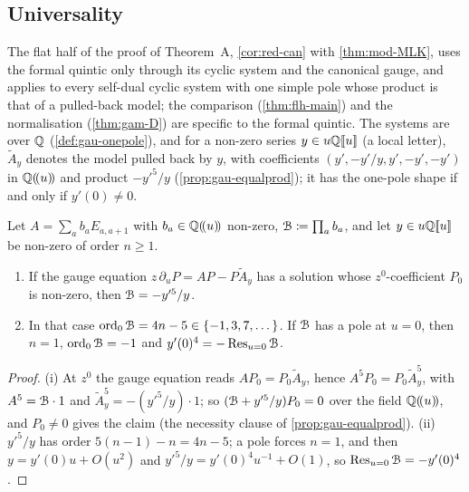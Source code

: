 \subsection{Universality}
\label{sec:mai-univ}

The flat half of the proof of Theorem~A, \cref{cor:red-can} with \cref{thm:mod-MLK}, uses the formal quintic only through its cyclic system and the canonical gauge, and applies to every self-dual cyclic system with one simple pole whose product is that of a pulled-back model; the comparison (\cref{thm:flh-main}) and the normalisation (\cref{thm:gam-D}) are specific to the formal quintic. The systems are over $\mathbb{Q}$ (\cref{def:gau-onepole}), and for a non-zero series $y\in u\mathbb{Q}[\![ u ]\!]$ (a local letter), $\tilde A_y$ denotes the model pulled back by $y$, with coefficients $(y',-y'/y,y',-y',-y')$ in $\mathbb{Q}(\!(u)\!)$ and product $-y'^5/y$ (\cref{prop:gau-equalprod}); it has the one-pole shape if and only if $y'(0)\neq0$.

\begin{lem}
\label{lem:mai-pole}
Let $A=\sum_ab_aE_{a,a+1}$ with $b_a\in\mathbb{Q}(\!(u)\!)$ non-zero, $\mathcal{B}\coloneqq\prod_ab_a$, and let $y\in u\mathbb{Q}[\![ u ]\!]$ be non-zero of order $n\geq1$.
\begin{enumerate}
\item If the gauge equation $z\,\partial_uP=AP-P\tilde A_y$ has a solution whose $z^0$-coefficient $P_0$ is non-zero, then $\mathcal{B}=-y'^5/y$.
\item In that case $\operatorname{ord}_0\mathcal{B}=4n-5\in\{-1,3,7,\dots\}$. If $\mathcal{B}$ has a pole at $u=0$, then $n=1$, $\operatorname{ord}_0\mathcal{B}=-1$ and $y'(0)^4=-\operatorname*{Res}_{u=0}\mathcal{B}$.
\end{enumerate}
\end{lem}

\begin{proof}
(i) At $z^0$ the gauge equation reads $AP_0=P_0\tilde A_y$, hence $A^5P_0=P_0\tilde A_y^5$, with $A^5=\mathcal{B}\cdot1$ and $\tilde A_y^5=-(y'^5/y)\cdot1$; so $(\mathcal{B}+y'^5/y)P_0=0$ over the field $\mathbb{Q}(\!(u)\!)$, and $P_0\neq0$ gives the claim (the necessity clause of \cref{prop:gau-equalprod}). (ii) $y'^5/y$ has order $5(n-1)-n=4n-5$; a pole forces $n=1$, and then $y=y'(0)u+O(u^2)$ and $y'^5/y=y'(0)^4u^{-1}+O(1)$, so $\operatorname*{Res}_{u=0}\mathcal{B}=-y'(0)^4$.
\end{proof}

